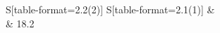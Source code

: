 \begin{tabular}{S[table-format=2.2(2)] S[table-format=2.1(1)]}
\toprule
{} & \\
  & 18.2  \\
\bottomrule
\end{tabular}